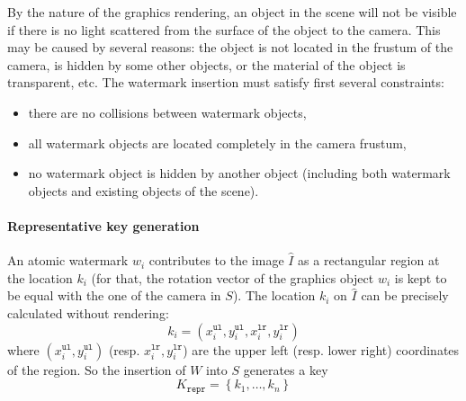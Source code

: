 By the nature of the graphics rendering, an object in the scene will not be visible if there is no light scattered from the surface of the object to the camera. This may be caused by several reasons: the object is not located in the frustum of the camera, is hidden by some other objects, or the material of the object is transparent, etc. The watermark insertion must satisfy first several constraints:
\begin{itemize}
    \item there are no collisions between watermark objects,
    \item all watermark objects are located completely in the camera frustum,
    \item no watermark object is hidden by another object (including both watermark objects and existing objects of the scene).
\end{itemize}

\paragraph[Representative key generation]{Representative key generation}
An atomic watermark $w_i$ contributes to the image $\hat{I}$ as a rectangular region at the location $k_i$ (for that, the rotation vector of the graphics object $w_i$ is kept to be equal with the one of the camera in $S$). The location $k_i$ on $\hat{I}$ can be precisely calculated without rendering:
\begin{equation*}
    k_i = \left(x^{\mathtt{ul}}_i, y^{\mathtt{ul}}_{i},x^{\mathtt{lr}}_i, y^{\mathtt{lr}}_{i}\right)
\end{equation*}
where $\left(x^{\mathtt{ul}}_i, y^{\mathtt{ul}}_{i}\right)$ (resp. $x^{\mathtt{lr}}_i, y^{\mathtt{lr}}_{i}$) are the upper left (resp. lower right) coordinates of the region. So the insertion of $W$ into $S$ generates a key
\begin{equation*}
    K_{\mathtt{repr}} = \left\{k_1,\dots,k_n \right\}
\end{equation*}

